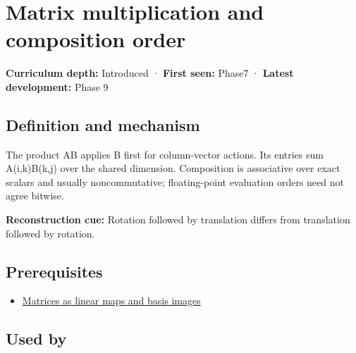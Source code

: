 \hypertarget{appendix-ab31ef447dbf}{}\label{referencestart:appendix-ab31ef447dbf}
\section{Matrix multiplication and composition order}\label{appendix-ab31ef447dbf-matrix-multiplication-and-composition-order}

\textbf{Curriculum depth:} Introduced · \textbf{First seen:} Phase7 · \textbf{Latest development:} Phase 9

\subsection{Definition and mechanism}\label{appendix-ab31ef447dbf-definition-and-mechanism}

The product AB applies B first for column-vector actions. Its entries sum A(i,k)B(k,j) over the shared dimension. Composition is associative over exact scalars and usually noncommutative; floating-point evaluation orders need not agree bitwise.

\textbf{Reconstruction cue:} Rotation followed by translation differs from translation followed by rotation.

\subsection{Prerequisites}\label{appendix-ab31ef447dbf-prerequisites}

\begin{itemize}
\tightlist
\item
  \hyperref[appendix-bd39c3bf5d64]{Matrices as linear maps and basis images}
\end{itemize}

\subsection{Used by}\label{appendix-ab31ef447dbf-used-by}

